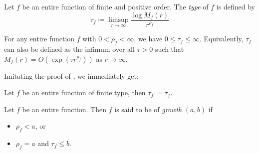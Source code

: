 \begin{definition}
    Let $f$ be an entire function of finite and positive order. The \emph{type} of $f$ is defined by
    \begin{equation} \label{eq:def-type}
        \tau_f \coloneqq \limsup_{r \to \infty} \frac{\log M_f(r)}{r^{\rho_f}}
    \end{equation}
\end{definition}

For any entire function $f$ with $0 < \rho_f < \infty$, we have $0 \leq \tau_f \leq \infty$. Equivalently, $\tau_f$ can also be defined as the infimum over all $\tau > 0$ such that $M_f(r) = O(\exp(\tau r^{\rho_f}))$ as $r \to \infty$.

Imitating the proof of , we immediately get:

\begin{proposition} \label{prop:type-derivative}
    Let $f$ be an entire function of finite type, then $\tau_{f'} = \tau_f$.
\end{proposition}

\begin{definition}
    Let $f$ be an entire function. Then $f$ is said to be of \emph{growth} $(a, b)$ if
    \begin{itemize}
        \item $\rho_f < a$, or
        \item $\rho_f = a$ and $\tau_f \leq b$.
    \end{itemize}
\end{definition}

\begin{example}
\end{example}